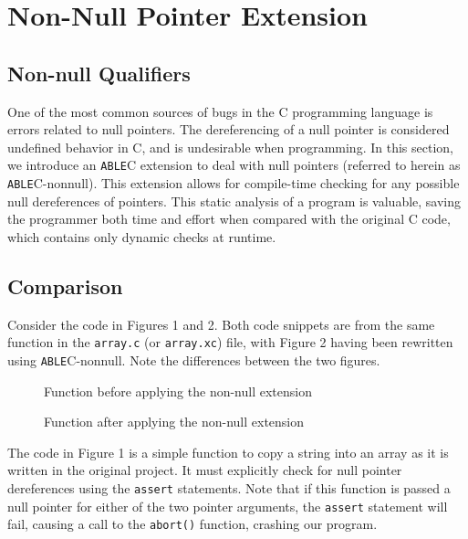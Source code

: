 \documentclass[main.tex]{subfiles}
\begin{document}
\section{Non-Null Pointer Extension}

\subsection{Non-null Qualifiers}
One of the most common sources of bugs in the C programming language is errors
related to null pointers. The dereferencing of a null pointer is considered
undefined behavior in C, and is undesirable when programming. In this section, we introduce an \verb|ABLE|C extension to
deal with null pointers (referred to herein as \verb|ABLE|C-nonnull). This extension allows for compile-time
checking for any possible null dereferences of pointers. This static analysis of a program is valuable, saving
the programmer both time and effort when compared with the original C code, which contains only dynamic checks
at runtime. 

\subsection{Comparison}

Consider the code in Figures 1 and 2. Both code snippets are from the same function in the \verb|array.c| (or \verb|array.xc|) file,
with Figure 2 having been rewritten using \verb|ABLE|C-nonnull. Note the differences between the two figures.

\begin{figure}[h]

\caption{Function before applying the non-null extension}
\end{figure}
\begin{figure}[h]

\caption{Function after applying the non-null extension}
\end{figure}

The code in Figure 1 is a simple function to copy a string into an array as it is written in the original project. It must explicitly
check for null pointer dereferences using the \verb|assert| statements. Note that if this function is passed a null pointer for either
of the two pointer arguments, the \verb|assert| statement will fail, causing a call to the \verb|abort()| function, crashing our
program.
\end{document}
